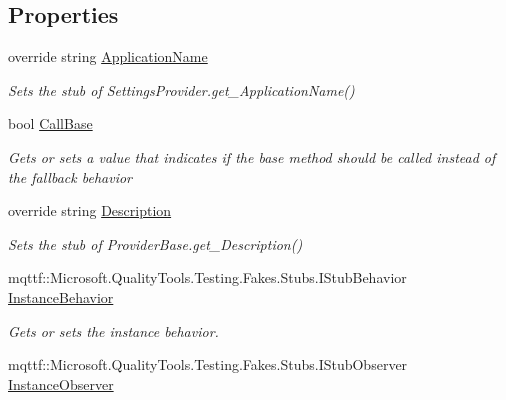\subsection*{Properties}
\begin{DoxyCompactItemize}
\item 
override string \hyperlink{class_system_1_1_configuration_1_1_fakes_1_1_stub_settings_provider_a842009c70b4db6995e7a1bd80a41f8ef}{Application\-Name}
\begin{DoxyCompactList}\small\item\em Sets the stub of Settings\-Provider.\-get\-\_\-\-Application\-Name()\end{DoxyCompactList}\item 
bool \hyperlink{class_system_1_1_configuration_1_1_fakes_1_1_stub_settings_provider_a50cc808fb724409623550341b8d2cee6}{Call\-Base}
\begin{DoxyCompactList}\small\item\em Gets or sets a value that indicates if the base method should be called instead of the fallback behavior\end{DoxyCompactList}\item 
override string \hyperlink{class_system_1_1_configuration_1_1_fakes_1_1_stub_settings_provider_aa268c452e2abe264df670659420ed408}{Description}
\begin{DoxyCompactList}\small\item\em Sets the stub of Provider\-Base.\-get\-\_\-\-Description()\end{DoxyCompactList}\item 
mqttf\-::\-Microsoft.\-Quality\-Tools.\-Testing.\-Fakes.\-Stubs.\-I\-Stub\-Behavior \hyperlink{class_system_1_1_configuration_1_1_fakes_1_1_stub_settings_provider_a505663404bffe2482c7459814722bd59}{Instance\-Behavior}
\begin{DoxyCompactList}\small\item\em Gets or sets the instance behavior.\end{DoxyCompactList}\item 
mqttf\-::\-Microsoft.\-Quality\-Tools.\-Testing.\-Fakes.\-Stubs.\-I\-Stub\-Observer \hyperlink{class_system_1_1_configuration_1_1_fakes_1_1_stub_settings_provider_afe4074ec4560afad39504223e8d627d8}{Instance\-Observer}

\end{DoxyCompactItemize}

